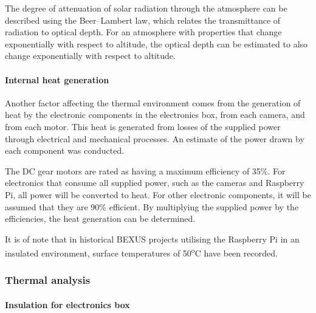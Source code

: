 The degree of attenuation of solar radiation through the atmosphere can be described using the Beer–Lambert law, which relates the transmittance of radiation to optical depth. For an atmosphere with properties that change exponentially with respect to altitude, the optical depth can be estimated to also change exponentially with respect to altitude. \\

\paragraph{Internal heat generation}
Another factor affecting the thermal environment comes from the generation of heat by the electronic components in the electronics box, from each camera, and from each motor. This heat is generated from losses of the supplied power through electrical and mechanical processes. An estimate of the power drawn by each component was conducted.



The DC gear motors are rated as having a maximum efficiency of 35\%. 
For electronics that consume all supplied power, such as the cameras and Raspberry Pi, all power will be converted to heat.
For other electronic components, it will be assumed that they are 90\% efficient. By multiplying the supplied power by the efficiencies, the heat generation can be determined.



It is of note that in historical BEXUS projects utilising the Raspberry Pi in an insulated environment, surface temperatures of 50\textsuperscript{o}C have been recorded. 





















\subsubsection{Thermal analysis}

\paragraph{Insulation for electronics box}

